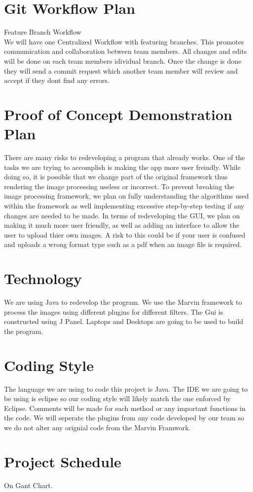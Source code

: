 \documentclass{article}
\begin{document}
\section{Git Workflow Plan}
Feature Branch Workflow\\
We will have one Centralized Workflow with featuring branches. This promotes communication and collaboration between team members. All changes and edits will be done on each team members idividual branch. Once the change is done they will send a commit request which another team member will review and accept if they dont find any errors.

\section{Proof of Concept Demonstration Plan}
There are many risks to redeveloping a program that already works. One of the tasks we are trying to accomplish is making the app more user freindly. While doing so, it is possible that we change part of the original framework thus rendering the image processing useless or incorrect. To prevent breaking the image processing framework, we plan on fully understanding the algorithms used within the framework as well implementing excessive step-by-step testing if any changes are needed to be made. In terms of redeveloping the GUI, we plan on making it much more user friendly, as well as adding an interface to allow the user to upload thier own images. A risk to this could be if your user is confused and uploads a wrong format type such as a pdf when an image file is required.

\section{Technology}
We are using Java to redevelop the program. We use the Marvin framework to process the images using different plugins for different filters. The Gui is constructed using J Panel. Laptops and Desktops are going to be used to build the program.

\section{Coding Style}
The language we are using to code this project is Java. The IDE we are going to be using is eclipse so our coding style will likely match the one enforced by Eclipse. Comments will be made for each method or any important functions in the code. We will seperate the plugins from any code developed by our team so we do not alter any orignial code from the Marvin Framwork.

\section{Project Schedule}
On Gant Chart.
\end{document}
